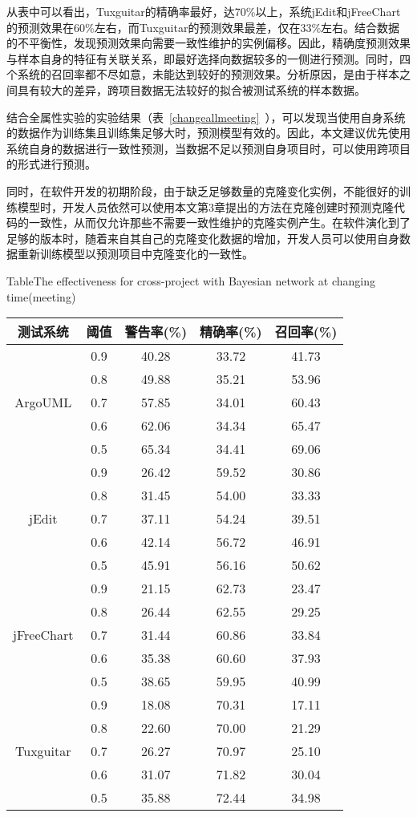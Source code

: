 从表中可以看出，Tuxguitar的精确率最好，达70\%以上，系统jEdit和jFreeChart的预测效果在60\%左右，而Tuxguitar的预测效果最差，仅在33\%左右。结合数据的不平衡性，发现预测效果向需要一致性维护的实例偏移。因此，精确度预测效果与样本自身的特征有关联关系，即最好选择向数据较多的一侧进行预测。同时，四个系统的召回率都不尽如意，未能达到较好的预测效果。分析原因，是由于样本之间具有较大的差异，跨项目数据无法较好的拟合被测试系统的样本数据。

结合全属性实验的实验结果（表~\ref{changeallmeeting}~），可以发现当使用自身系统的数据作为训练集且训练集足够大时，预测模型有效的。因此，本文建议优先使用系统自身的数据进行一致性预测，当数据不足以预测自身项目时，可以使用跨项目的形式进行预测。

同时，在软件开发的初期阶段，由于缺乏足够数量的克隆变化实例，不能很好的训练模型时，开发人员依然可以使用本文第3章提出的方法在克隆创建时预测克隆代码的一致性，从而仅允许那些不需要一致性维护的克隆实例产生。在软件演化到了足够的版本时，随着来自其自己的克隆变化数据的增加，开发人员可以使用自身数据重新训练模型以预测项目中克隆变化的一致性。

\begin{table}[htbp]
{Table$\!$}{The effectiveness for cross-project with Bayesian network at changing time(meeting)}
\vspace{0.5em}
\centering
\wuhao
\begin{tabular}{ccccc}
\toprule[1.5pt]
{测试系统}&{阈值}&{警告率(\%)}&{精确率(\%)}&{召回率(\%)}\\
\midrule[1pt]
\multirow{5}{*}{ArgoUML}
&0.9&	40.28&	33.72&	41.73\\
&0.8&	49.88&	35.21&	53.96\\
&0.7&	57.85&	34.01&	60.43\\
&0.6&	62.06&	34.34&	65.47\\
&0.5&	65.34&	34.41&	69.06\\
\hline
\multirow{5}{*}{jEdit}
&0.9&	26.42&	59.52&	30.86\\
&0.8&	31.45&	54.00&	33.33\\
&0.7&	37.11&	54.24&	39.51\\
&0.6&	42.14&	56.72&	46.91\\
&0.5&	45.91&	56.16&	50.62\\
\hline
\multirow{5}{*}{jFreeChart}
&0.9&	21.15&	62.73&	23.47\\
&0.8&	26.44&	62.55&	29.25\\
&0.7&	31.44&	60.86&	33.84\\
&0.6&	35.38&	60.60&	37.93\\
&0.5&	38.65&	59.95&	40.99\\
\hline
\multirow{5}{*}{Tuxguitar}
&0.9&	18.08&	70.31&	17.11\\
&0.8&	22.60&	70.00&	21.29\\
&0.7&	26.27&	70.97&	25.10\\
&0.6&	31.07&	71.82&	30.04\\
&0.5&	35.88&	72.44&	34.98\\
\bottomrule[1.5pt]
\end{tabular}
\end{table}

